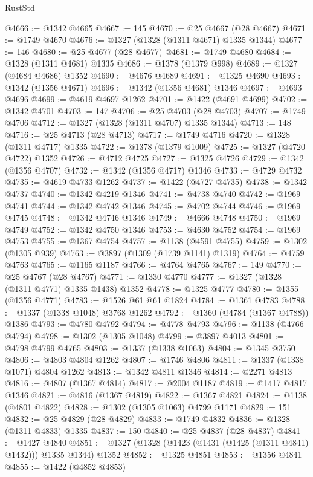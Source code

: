 \begin{lexlean}{RustStd}
\begin{coremodule}
@4666 := @1342 @4665
@4667 := 145
@4670 := @25 @4667 (@28 @4667)
@4671 := @1749 @4670
@4676 := @1327 (@1328 (@1311 @4671) @1335 @1344)
@4677 := 146
@4680 := @25 @4677 (@28 @4677)
@4681 := @1749 @4680
@4684 := @1328 (@1311 @4681) @1335
@4686 := @1378 (@1379 @998)
@4689 := @1327 (@4684 @4686) @1352
@4690 := @4676 @4689
@4691 := @1325 @4690
@4693 := @1342 (@1356 @4671)
@4696 := @1342 (@1356 @4681) @1346
@4697 := @4693 @4696
@4699 := @4619 @4697 @1262
@4701 := @1422 (@4691 @4699)
@4702 := @1342 @4701
@4703 := 147
@4706 := @25 @4703 (@28 @4703)
@4707 := @1749 @4706
@4712 := @1327 (@1328 (@1311 @4707) @1335 @1344)
@4713 := 148
@4716 := @25 @4713 (@28 @4713)
@4717 := @1749 @4716
@4720 := @1328 (@1311 @4717) @1335
@4722 := @1378 (@1379 @1009)
@4725 := @1327 (@4720 @4722) @1352
@4726 := @4712 @4725
@4727 := @1325 @4726
@4729 := @1342 (@1356 @4707)
@4732 := @1342 (@1356 @4717) @1346
@4733 := @4729 @4732
@4735 := @4619 @4733 @1262
@4737 := @1422 (@4727 @4735)
@4738 := @1342 @4737
@4740 := @1342 @4219 @1346
@4741 := @4738 @4740
@4742 := @1969 @4741
@4744 := @1342 @4742 @1346
@4745 := @4702 @4744
@4746 := @1969 @4745
@4748 := @1342 @4746 @1346
@4749 := @4666 @4748
@4750 := @1969 @4749
@4752 := @1342 @4750 @1346
@4753 := @4630 @4752
@4754 := @1969 @4753
@4755 := @1367 @4754
@4757 := @1138 (@4591 @4755)
@4759 := @1302 (@1305 @939)
@4763 := @3897 (@1309 (@1739 @1141) @1319)
@4764 := @4759 @4763
@4765 := @1165 @1187
@4766 := @4764 @4765
@4767 := 149
@4770 := @25 @4767 (@28 @4767)
@4771 := @1330 @4770
@4777 := @1327 (@1328 (@1311 @4771) @1335 @1438) @1352
@4778 := @1325 @4777
@4780 := @1355 (@1356 @4771)
@4783 := @1526 @61 @61 @1824
@4784 := @1361 @4783
@4788 := @1337 (@1338 @1048) @3768 @1262
@4792 := @1360 (@4784 (@1367 @4788)) @1386
@4793 := @4780 @4792
@4794 := @4778 @4793
@4796 := @1138 (@4766 @4794)
@4798 := @1302 (@1305 @1048)
@4799 := @3897 @4013
@4801 := @4798 @4799 @4765
@4803 := @1337 (@1338 @1063)
@4804 := @1345 @3750
@4806 := @4803 @4804 @1262
@4807 := @1746 @4806
@4811 := @1337 (@1338 @1071) @4804 @1262
@4813 := @1342 @4811 @1346
@4814 := @2271 @4813
@4816 := @4807 (@1367 @4814)
@4817 := @2004 @1187
@4819 := @1417 @4817 @1346
@4821 := @4816 (@1367 @4819)
@4822 := @1367 @4821
@4824 := @1138 (@4801 @4822)
@4828 := @1302 (@1305 @1063) @4799 @1171
@4829 := 151
@4832 := @25 @4829 (@28 @4829)
@4833 := @1749 @4832
@4836 := @1328 (@1311 @4833) @1335
@4837 := 150
@4840 := @25 @4837 (@28 @4837)
@4841 := @1427 @4840
@4851 := @1327 (@1328 (@1423 (@1431 (@1425 (@1311 @4841) @1432))) @1335 @1344) @1352
@4852 := @1325 @4851
@4853 := @1356 @4841
@4855 := @1422 (@4852 @4853)

\end{coremodule}
\end{lexlean}
